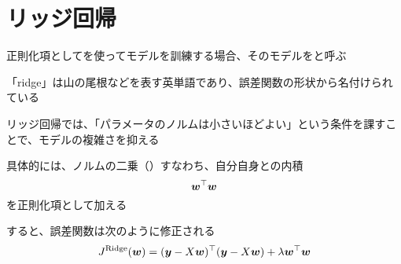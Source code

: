 \documentclass[../../../topic_machine-learning]{subfiles}
\begin{document}
\sectionline
\section{リッジ回帰}

正則化項としてを使ってモデルを訓練する場合、そのモデルをと呼ぶ

「ridge」は山の尾根などを表す英単語であり、誤差関数の形状から名付けられている

\br

リッジ回帰では、「パラメータのノルムは小さいほどよい」という条件を課すことで、モデルの複雑さを抑える

\br

具体的には、ノルムの二乗（）すなわち、自分自身との内積
\begin{equation*}
  \vb*{w}^\top \vb*{w}
\end{equation*}
を正則化項として加える

\br

すると、誤差関数は次のように修正される
\begin{equation*}
  J^{\text{Ridge}}(\vb*{w}) = (\vb*{y} - X\vb*{w})^\top (\vb*{y} - X\vb*{w}) + \lambda \vb*{w}^\top \vb*{w}
\end{equation*}
\end{document}
